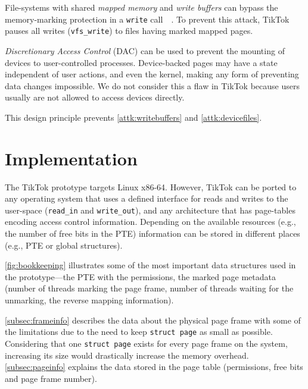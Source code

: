 \documentclass[conference]{IEEEtran}
\newcommand{\sysname}{TikTok}
\begin{document}
File-systems with shared
\emph{mapped memory} and \emph{write buffers} can bypass the memory-marking
protection in a \texttt{write} call~~\cite{watson2007exploiting}. To prevent
this attack, \sysname{} pauses
all writes (\texttt{vfs\_write}) to files having marked mapped pages.

\emph{Discretionary Access Control} (DAC) can be used to prevent the mounting of
devices to user-controlled processes. Device-backed pages may have a state
independent of user actions, and even the kernel, making any form of preventing
data changes impossible. We do not consider this a flaw in \sysname{} because
users usually are not allowed to access devices directly.

This design principle prevents \autoref{attk:writebuffers} and
\autoref{attk:devicefiles}.


\section{Implementation} \label{sec:implementation}

The \sysname{} prototype targets Linux x86-64. However, \sysname{}
can be ported to any operating system that uses a defined interface for reads and
writes to the user-space (\texttt{read\_in} and \texttt{write\_out}), and any
architecture that has page-tables encoding access control information. Depending
on the available resources (e.g., the number of free bits in the PTE) information
can be stored in different places (e.g., PTE or global structures).

\autoref{fig:bookkeeping} illustrates some of the most important data structures
used in the prototype---the PTE with the permissions, the marked page metadata
(number of threads marking the page frame, number of threads waiting for the
unmarking, the reverse mapping information). 

\autoref{subsec:frameinfo} describes the data about the physical page frame with
some of the limitations due to the need to keep \texttt{struct page} as small as
possible. Considering that one \texttt{struct page} exists for every page frame
on the system, increasing its size would drastically increase the memory
overhead.  \autoref{subsec:pageinfo} explains the data stored in the page table
(permissions, free bits and page frame number).
\end{document}

